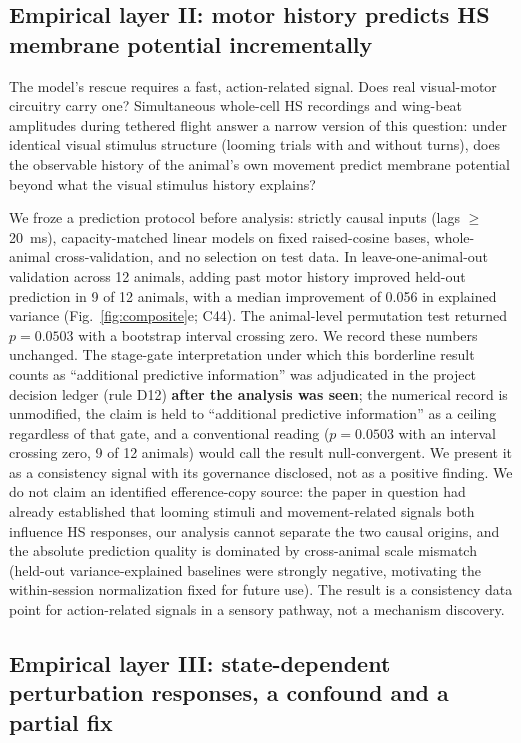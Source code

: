 \documentclass[pdflatex,sn-nature]{sn-jnl}
\begin{document}
\subsection{Empirical layer II: motor history predicts HS membrane potential incrementally}

The model's rescue requires a fast, action-related signal. Does real visual-motor circuitry carry one? Simultaneous whole-cell HS recordings and wing-beat amplitudes during tethered flight \cite{fischer2022multiple} answer a narrow version of this question: under identical visual stimulus structure (looming trials with and without turns), does the observable history of the animal's own movement predict membrane potential beyond what the visual stimulus history explains?

We froze a prediction protocol before analysis: strictly causal inputs (lags $\ge$ 20~ms), capacity-matched linear models on fixed raised-cosine bases, whole-animal cross-validation, and no selection on test data. In leave-one-animal-out validation across 12 animals, adding past motor history improved held-out prediction in 9 of 12 animals, with a median improvement of 0.056 in explained variance (Fig.~\ref{fig:composite}e; C44). The animal-level permutation test returned $p=0.0503$ with a bootstrap interval crossing zero. We record these numbers unchanged. The stage-gate interpretation under which this borderline result counts as ``additional predictive information'' was adjudicated in the project decision ledger (rule D12) \textbf{after the analysis was seen}; the numerical record is unmodified, the claim is held to ``additional predictive information'' as a ceiling regardless of that gate, and a conventional reading ($p=0.0503$ with an interval crossing zero, 9 of 12 animals) would call the result null-convergent. We present it as a consistency signal with its governance disclosed, not as a positive finding. We do not claim an identified efference-copy source: the paper in question had already established that looming stimuli and movement-related signals both influence HS responses, our analysis cannot separate the two causal origins, and the absolute prediction quality is dominated by cross-animal scale mismatch (held-out variance-explained baselines were strongly negative, motivating the within-session normalization fixed for future use). The result is a consistency data point for action-related signals in a sensory pathway, not a mechanism discovery.

\subsection{Empirical layer III: state-dependent perturbation responses, a confound and a partial fix}
\end{document}
